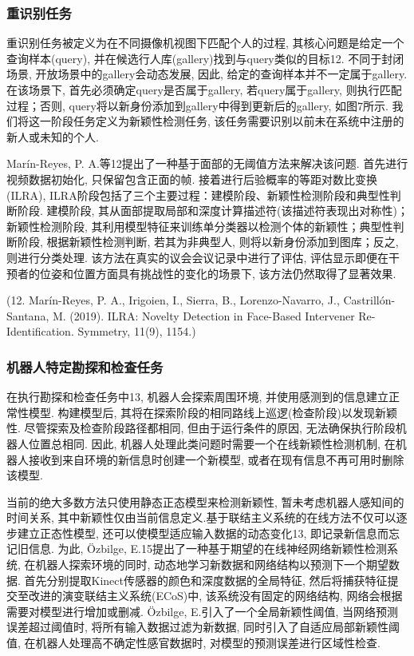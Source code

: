 \documentclass{Style/aas}
\begin{document}
\begin{multicols}{2}
  \subsubsection{重识别任务}
  重识别任务被定义为在不同摄像机视图下匹配个人的过程, 其核心问题是给定一个查询样本(query), 并在候选行人库(gallery)找到与query类似的目标12. 不同于封闭场景, 开放场景中的gallery会动态发展, 因此, 给定的查询样本并不一定属于gallery. 在该场景下, 首先必须确定query是否属于gallery, 若query属于gallery, 则执行匹配过程；否则, query将以新身份添加到gallery中得到更新后的gallery, 如图7所示. 我们将这一阶段任务定义为新颖性检测任务, 该任务需要识别以前未在系统中注册的新人或未知的个人.

  Marín-Reyes, P. A.等12提出了一种基于面部的无阈值方法来解决该问题. 首先进行视频数据初始化, 只保留包含正面的帧. 接着进行后验概率的等距对数比变换(ILRA), ILRA阶段包括了三个主要过程：建模阶段、新颖性检测阶段和典型性判断阶段. 建模阶段, 其从面部提取局部和深度计算描述符(该描述符表现出对称性)；新颖性检测阶段, 其利用模型特征来训练单分类器以检测个体的新颖性；典型性判断阶段, 根据新颖性检测判断, 若其为非典型人, 则将以新身份添加到图库；反之, 则进行分类处理. 该方法在真实的议会会议记录中进行了评估, 评估显示即便在干预者的位姿和位置方面具有挑战性的变化的场景下, 该方法仍然取得了显著效果.

  (12.	Marín-Reyes, P. A., Irigoien, I., Sierra, B., Lorenzo-Navarro, J., Castrillón-Santana, M. (2019). ILRA: Novelty Detection in Face-Based Intervener Re-Identification. Symmetry, 11(9), 1154.)

  \subsubsection{机器人特定勘探和检查任务}
  在执行勘探和检查任务中13, 机器人会探索周围环境, 并使用感测到的信息建立正常性模型. 构建模型后, 其将在探索阶段的相同路线上巡逻(检查阶段)以发现新颖性. 尽管探索及检查阶段路径都相同, 但由于运行条件的原因, 无法确保执行阶段机器人位置总相同. 因此, 机器人处理此类问题时需要一个在线新颖性检测机制, 在机器人接收到来自环境的新信息时创建一个新模型, 或者在现有信息不再可用时删除该模型.

  当前的绝大多数方法只使用静态正态模型来检测新颖性, 暂未考虑机器人感知间的时间关系, 其中新颖性仅由当前信息定义.基于联结主义系统的在线方法不仅可以逐步建立正态性模型, 还可以使模型适应输入数据的动态变化13, 即记录新信息而忘记旧信息. 为此, Özbilge, E.15提出了一种基于期望的在线神经网络新颖性检测系统, 在机器人探索环境的同时, 动态地学习新数据和网络结构以预测下一个期望数据. 首先分别提取Kinect传感器的颜色和深度数据的全局特征, 然后将捕获特征提交至改进的演变联结主义系统(ECoS)中, 该系统没有固定的网络结构, 网络会根据需要对模型进行增加或删减. Özbilge, E.引入了一个全局新颖性阈值, 当网络预测误差超过阈值时, 将所有输入数据过滤为新数据, 同时引入了自适应局部新颖性阈值, 在机器人处理高不确定性感官数据时, 对模型的预测误差进行区域性检查.


\end{multicols}
\end{document}
